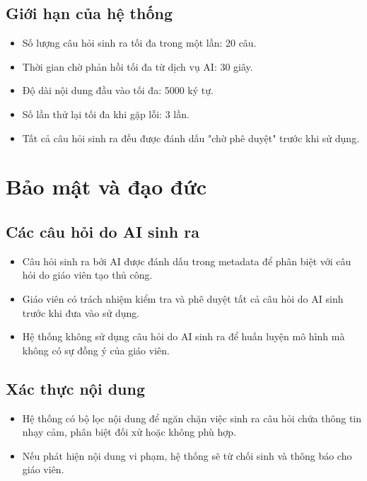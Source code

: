 ﻿\documentclass[../DoAn.tex]{subfiles}
\begin{document}
\subsection{Giới hạn của hệ thống}
\begin{itemize}
    \item Số lượng câu hỏi sinh ra tối đa trong một lần: 20 câu.
    \item Thời gian chờ phản hồi tối đa từ dịch vụ AI: 30 giây.
    \item Độ dài nội dung đầu vào tối đa: 5000 ký tự.
    \item Số lần thử lại tối đa khi gặp lỗi: 3 lần.
    \item Tất cả câu hỏi sinh ra đều được đánh dấu "chờ phê duyệt" trước khi sử dụng.
\end{itemize}

\section{Bảo mật và đạo đức}

\subsection{Các câu hỏi do AI sinh ra}
\begin{itemize}
    \item Câu hỏi sinh ra bởi AI được đánh dấu trong metadata để phân biệt với câu hỏi do giáo viên tạo thủ công.
    \item Giáo viên có trách nhiệm kiểm tra và phê duyệt tất cả câu hỏi do AI sinh trước khi đưa vào sử dụng.
    \item Hệ thống không sử dụng câu hỏi do AI sinh ra để huấn luyện mô hình mà không có sự đồng ý của giáo viên.
\end{itemize}

\subsection{Xác thực nội dung}
\begin{itemize}
    \item Hệ thống có bộ lọc nội dung để ngăn chặn việc sinh ra câu hỏi chứa thông tin nhạy cảm, phân biệt đối xử hoặc không phù hợp.
    \item Nếu phát hiện nội dung vi phạm, hệ thống sẽ từ chối sinh và thông báo cho giáo viên.
\end{itemize}
\end{document}
